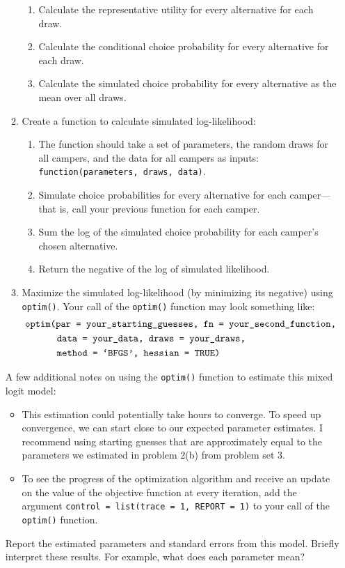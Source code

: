 \documentclass[11pt,letterpaper]{article}\usepackage[]{graphicx}\usepackage[]{color}
\begin{document}
\begin{enumerate}[label=\alph*., leftmargin=*]
\begin{enumerate}[label=\Roman*.]
\begin{enumerate}[label=\roman*.]
			\item Calculate the representative utility for every alternative for each draw.
			\item Calculate the conditional choice probability for every alternative for each draw.
			\item Calculate the simulated choice probability for every alternative as the mean over all draws.
		\end{enumerate}
		\item Create a function to calculate simulated log-likelihood:
		\begin{enumerate}[label=\roman*.]
			\item The function should take a set of parameters, the random draws for all campers, and the data for all campers as inputs: \texttt{function(parameters, draws, data)}.
			\item Simulate choice probabilities for every alternative for each camper---that is, call your previous function for each camper.
			\item Sum the log of the simulated choice probability for each camper's chosen alternative.
			\item Return the negative of the log of simulated likelihood.
		\end{enumerate}
		\item Maximize the simulated log-likelihood (by minimizing its negative) using \texttt{optim()}. Your call of the \texttt{optim()} function may look something like:
		\begin{align*}
			&\text{\texttt{optim(par = your\_starting\_guesses, fn = your\_second\_function,}} \\
			& \qquad \quad \; \text{\texttt{data = your\_data, draws = your\_draws,}} \\
			& \qquad \quad \; \text{\texttt{method = `BFGS', hessian = TRUE)}}
		\end{align*}
	\end{enumerate}
	A few additional notes on using the \texttt{optim()} function to estimate this mixed logit model:
	\begin{itemize}
		\item This estimation could potentially take hours to converge. To speed up convergence, we can start close to our expected parameter estimates. I recommend using starting guesses that are approximately equal to the parameters we estimated in problem 2(b) from problem set 3.
		\item To see the progress of the optimization algorithm and receive an update on the value of the objective function at every iteration, add the argument \texttt{control = list(trace = 1, REPORT = 1)} to your call of the \texttt{optim()} function.
	\end{itemize}
	Report the estimated parameters and standard errors from this model. Briefly interpret these results. For example, what does each parameter mean?


\end{enumerate}
\end{document}
